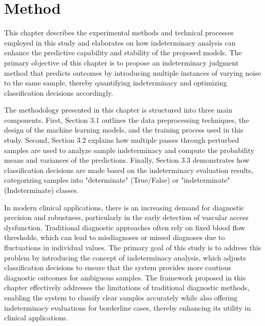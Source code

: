 \chapter{Method}
\label{chapter:secorder}
This chapter describes the experimental methods and technical processes employed in this study and elaborates on how indeterminacy analysis can enhance the predictive capability and stability of the proposed models. The primary objective of this chapter is to propose an indeterminacy judgment method that predicts outcomes by introducing multiple instances of varying noise to the same sample, thereby quantifying indeterminacy and optimizing classification decisions accordingly.

The methodology presented in this chapter is structured into three main components. First, Section 3.1 outlines the data preprocessing techniques, the design of the machine learning models, and the training process used in this study. Second, Section 3.2 explains how multiple passes through perturbed samples are used to analyze sample indeterminacy and compute the probability means and variances of the predictions. Finally, Section 3.3 demonstrates how classification decisions are made based on the indeterminacy evaluation results, categorizing samples into "determinate" (True/False) or "indeterminate" (Indeterminate) classes.

In modern clinical applications, there is an increasing demand for diagnostic precision and robustness, particularly in the early detection of vascular access dysfunction. Traditional diagnostic approaches often rely on fixed blood flow thresholds, which can lead to misdiagnoses or missed diagnoses due to fluctuations in individual values. The primary goal of this study is to address this problem by introducing the concept of indeterminacy analysis, which adjusts classification decisions to ensure that the system provides more cautious diagnostic outcomes for ambiguous samples. The framework proposed in this chapter effectively addresses the limitations of traditional diagnostic methods, enabling the system to classify clear samples accurately while also offering indeterminacy evaluations for borderline cases, thereby enhancing its utility in clinical applications.

